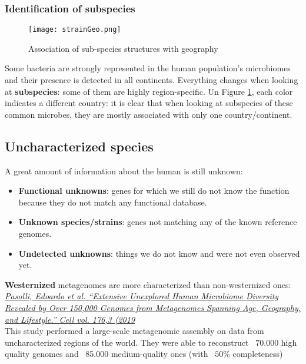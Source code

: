 \subsubsection{Identification of subspecies}

\begin{figure}[!h]
\centering
\texttt{[image: strainGeo.png]}
\caption{\label{fig:geo}Association of sub-species structures with geography}
\end{figure}

Some bacteria are strongly represented in the human population’s microbiomes and their presence is detected in all continents. Everything changes when looking at \textbf{subspecies}: some of them are highly region-specific. 
Un Figure \ref{fig:geo}, each color indicates a different country: it is clear that when looking at subspecies of these common microbes, they are mostly associated with only one country/continent.

\subsection{Uncharacterized species}

A great amount of information about the human is still unknown:
\begin{itemize}
    \item \textbf{Functional unknowns}: genes for which we still do not know the function because they do not match any functional database.
    \item \textbf{Unknown species/strains}: genes not matching any of the known reference genomes.
    \item \textbf{Undetected unknowns}: things we do not know and were not even observed yet.
\end{itemize}

\textbf{Westernized} metagenomes are more characterized than non-westernized ones: \\

\href{https://www.sciencedirect.com/science/article/pii/S0092867419300017}{\emph{Pasolli, Edoardo et al. “Extensive Unexplored Human Microbiome Diversity Revealed by Over 150,000 Genomes from Metagenomes Spanning Age, Geography, and Lifestyle.” Cell vol. 176,3 (2019}}\\

This study performed a large-scale metagenomic assembly on data from uncharacterized regions of the world.
They were able to reconstruct ~$70.000$ high quality genomes and ~85.000 medium-quality ones (with ~$50$\% completeness)\\

